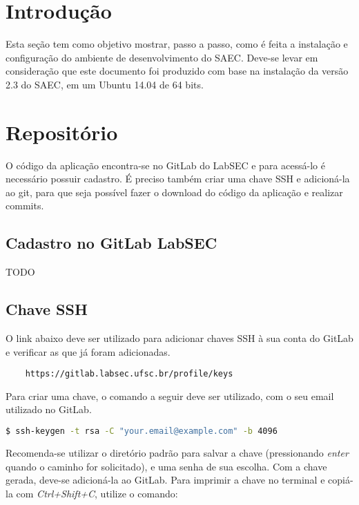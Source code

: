
\section{Introdução}
Esta seção tem como objetivo mostrar, passo a passo, como é feita a instalação e configuração do ambiente de desenvolvimento do SAEC. Deve-se levar em consideração que este documento foi produzido com base na instalação da versão 2.3 do SAEC, em um Ubuntu 14.04 de 64 bits.


\section{Repositório}
O código da aplicação encontra-se no GitLab do LabSEC e para acessá-lo é necessário possuir cadastro. É preciso também criar uma chave SSH e adicioná-la ao git, para que seja possível fazer o download do código da aplicação e realizar commits.

\subsection{Cadastro no GitLab LabSEC}
TODO

\subsection{Chave SSH}
O link abaixo deve ser utilizado para adicionar chaves SSH à sua conta do GitLab e verificar as que já foram adicionadas.

\begin{lstlisting}
    https://gitlab.labsec.ufsc.br/profile/keys
\end{lstlisting}

Para criar uma chave, o comando a seguir deve ser utilizado, com o seu email utilizado no GitLab.

\begin{lstlisting}[language=bash]
    $ ssh-keygen -t rsa -C "your.email@example.com" -b 4096
\end{lstlisting}

Recomenda-se utilizar o diretório padrão para salvar a chave (pressionando \textit{enter} quando o caminho for solicitado), e uma senha de sua escolha. Com a chave gerada, deve-se adicioná-la ao GitLab. Para imprimir a chave no terminal e copiá-la com \textit{Ctrl+Shift+C}, utilize o comando:

